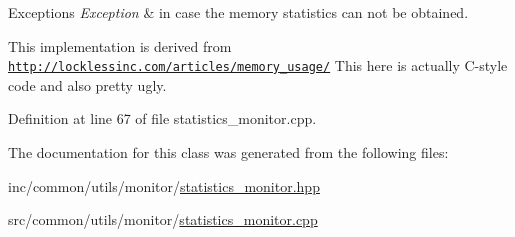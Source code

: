 \begin{DoxyExceptions}{Exceptions}
{\em Exception} & in case the memory statistics can not be obtained.\\
\hline
\end{DoxyExceptions}
This implementation is derived from \href{http://locklessinc.com/articles/memory_usage/}{\tt http\+://locklessinc.\+com/articles/memory\+\_\+usage/} This here is actually C-\/style code and also pretty ugly. 

Definition at line 67 of file statistics\+\_\+monitor.\+cpp.



The documentation for this class was generated from the following files\+:\begin{DoxyCompactItemize}
\item 
inc/common/utils/monitor/\hyperlink{statistics__monitor_8hpp}{statistics\+\_\+monitor.\+hpp}\item 
src/common/utils/monitor/\hyperlink{statistics__monitor_8cpp}{statistics\+\_\+monitor.\+cpp}\end{DoxyCompactItemize}
